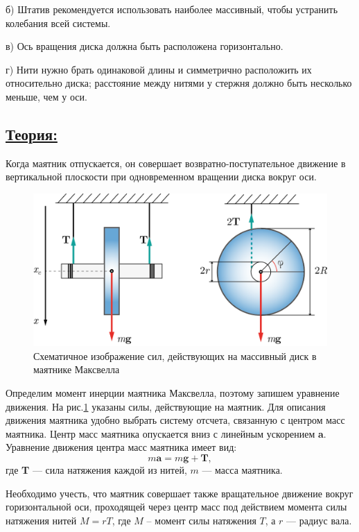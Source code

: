 \documentclass[14pt,a4paper,oneside]{extarticle}	%
\begin{document}
б) Штатив рекомендуется использовать наиболее массивный, чтобы устранить колебания всей системы.

в) Ось вращения диска должна быть расположена горизонтально.

г) Нити нужно брать одинаковой длины и симметрично расположить их относительно диска; расстояние между нитями у стержня должно быть несколько меньше, чем у оси.
	
\newpage
\subsection*{\underline{Теория:}}
		
	 Когда маятник отпускается, он совершает возвратно-поступательное движение в вертикальной плоскости при одновременном вращении диска вокруг оси.
	
		\begin{figure}[H] 	
		\centering 	
		\includegraphics[width=0.9\linewidth]{Maxwell-3.png}
		\caption{Схематичное изображение сил, действующих на массивный диск в маятнике Максвелла}
		\label{Maxwell-3}
	\end{figure}
	 
	Определим момент инерции маятника Максвелла, поэтому запишем уравнение движения.
	На рис.\ref{Maxwell-3} указаны силы, действующие на маятник.
	Для описания движения маятника удобно выбрать систему отсчета, связанную с центром масс маятника.
	Центр масс маятника опускается вниз с линейным ускорением \textbf{a}.
	Уравнение движения центра масс маятника имеет вид:
	\begin{equation}\label{Maxwell-1eq1}
	m\textbf{a} = m\textbf{g} + \textbf{T},
	\end{equation}
	где  \textbf{T}  — сила натяжения каждой из нитей, $ m $ — масса маятника.
	
	Необходимо учесть, что маятник совершает также вращательное движение вокруг горизонтальной оси, проходящей через центр масс под действием момента силы натяжения нитей $ M = r T $, где $ M $ – момент силы натяжения $ T $, а $ r $ — радиус вала.
	
\end{document}

